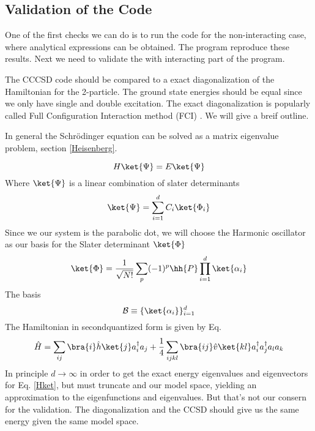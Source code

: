 \subsection{Validation of the Code}
One of the first checks we can do is to run the code for the non-interacting case, where analytical expressions can be obtained. The program reproduce these results. Next we need to validate the with interacting part of the program. 

The CCCSD code should be compared to a exact diagonalization of the Hamiltonian for the 2-particle. The ground state energies should be equal since we only have single and double excitation. The exact diagonalization is popularly called Full Configuration Interaction method (FCI) \cite{Kvaal2008}. We will give a breif outline. 

In general the Schr\"{o}dinger equation can be solved as a matrix eigenvalue problem, section \ref{Heisenberg}. 

\begin{equation}
  H\ket{\Psi} = E \ket{\Psi}
  \label{Hket}
\end{equation}
%
Where $\ket{\Psi}$ is a linear combination of slater determinants 
%
\begin{equation}
\ket{\Psi} = \sum_{i=1}^{d} C_i \ket{\Phi_i}
  \label{d}
\end{equation}
%
Since we our system is the parabolic dot, we will choose the Harmonic oscillator as our basis for the Slater determinant $\ket{\Phi}$
%
\begin{equation}
  \ket{\Phi} = \frac{1}{\sqrt{N!}} \sum_p (-1)^p \hh{P} \prod_{i=1}^d \ket{\alpha_i}
\end{equation}
%
The basis
\begin{equation}
  \mathcal{B} \equiv \{\ket{\alpha_i}\}_{i=1}^{d}
\end{equation}
%
The Hamiltonian in secondquantized form is given by Eq. 
%
\begin{equation}
\hat{H} = \sum_{ij} \bra{i}\hat{h}\ket{j}a_i^{\dagger} a_j+ \frac{1}{4} \sum_{ijkl} \bra{ij}\hat{v}\ket{kl} a_i^{\dagger} a_j^{\dagger} a_l a_k
 \label{def:secondquantized hamiltonian}
\end{equation}
%
In principle $d \rightarrow \infty$ in order to get the exact energy eigenvalues and eigenvectors for Eq. \ref{Hket}, but must truncate and our model space, yielding an approximation to the eigenfunctions and eigenvalues. But that's not our consern for the validation. The diagonalization and the CCSD should give us the same energy given the same model space.

